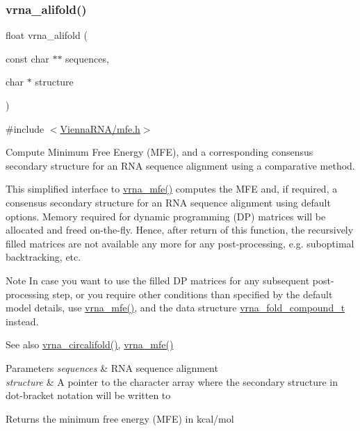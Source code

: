\subsubsection{\texorpdfstring{vrna\+\_\+alifold()}{vrna\_alifold()}}
{\footnotesize\ttfamily float vrna\+\_\+alifold (\begin{DoxyParamCaption}\item[{const char $\ast$$\ast$}]{sequences,  }\item[{char $\ast$}]{structure }\end{DoxyParamCaption})}



{\ttfamily \#include $<$\hyperlink{mfe_8h}{Vienna\+R\+N\+A/mfe.\+h}$>$}



Compute Minimum Free Energy (M\+FE), and a corresponding consensus secondary structure for an R\+NA sequence alignment using a comparative method. 

This simplified interface to \hyperlink{group__mfe__global_gabd3b147371ccf25c577f88bbbaf159fd}{vrna\+\_\+mfe()} computes the M\+FE and, if required, a consensus secondary structure for an R\+NA sequence alignment using default options. Memory required for dynamic programming (DP) matrices will be allocated and free\textquotesingle{}d on-\/the-\/fly. Hence, after return of this function, the recursively filled matrices are not available any more for any post-\/processing, e.\+g. suboptimal backtracking, etc.

\begin{DoxyNote}{Note}
In case you want to use the filled DP matrices for any subsequent post-\/processing step, or you require other conditions than specified by the default model details, use \hyperlink{group__mfe__global_gabd3b147371ccf25c577f88bbbaf159fd}{vrna\+\_\+mfe()}, and the data structure \hyperlink{group__fold__compound_ga1b0cef17fd40466cef5968eaeeff6166}{vrna\+\_\+fold\+\_\+compound\+\_\+t} instead.
\end{DoxyNote}
\begin{DoxySeeAlso}{See also}
\hyperlink{group__mfe__global_ga17a1be7490468c29c335ba9bffacba53}{vrna\+\_\+circalifold()}, \hyperlink{group__mfe__global_gabd3b147371ccf25c577f88bbbaf159fd}{vrna\+\_\+mfe()}
\end{DoxySeeAlso}

\begin{DoxyParams}{Parameters}
{\em sequences} & R\+NA sequence alignment \\
\hline
{\em structure} & A pointer to the character array where the secondary structure in dot-\/bracket notation will be written to \\
\hline
\end{DoxyParams}
\begin{DoxyReturn}{Returns}
the minimum free energy (M\+FE) in kcal/mol 
\end{DoxyReturn}
\mbox{\label{group__mfe__global_ga17a1be7490468c29c335ba9bffacba53}} 

